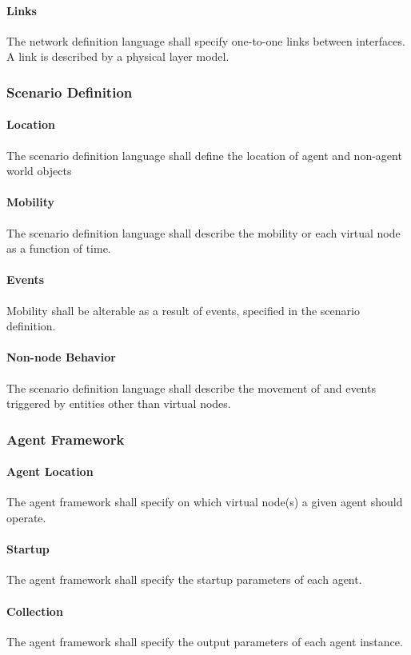 \documentclass[titlepage]{article}
\begin{document}
\paragraph{Links} The network definition language shall specify one-to-one links between interfaces.  A link is
described by a physical layer model.

\subsubsection{Scenario Definition}
\paragraph{Location} The scenario definition language shall define the location of agent and non-agent world objects
\paragraph{Mobility} The scenario definition language shall describe the mobility or each virtual node as a function of
time.
\paragraph{Events} Mobility shall be alterable as a result of events, specified in the scenario definition.
\paragraph{Non-node Behavior} The scenario definition language shall describe the movement of and events triggered by
entities other than virtual nodes.

\subsubsection{Agent Framework}
\paragraph{Agent Location} The agent framework shall specify on which virtual node(s) a given agent should operate.
\paragraph{Startup} The agent framework shall specify the startup parameters of each agent.
\paragraph{Collection} The agent framework shall specify the output parameters of each agent instance.
\end{document}
